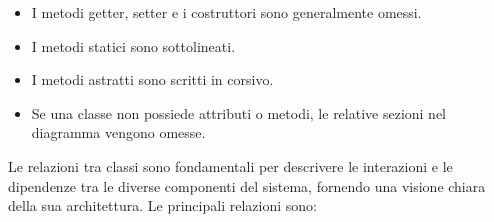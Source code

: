 
\begin{itemize}
    \item I metodi getter, setter e i costruttori sono generalmente omessi.
    \item I metodi statici sono sottolineati.
    \item I metodi astratti sono scritti in corsivo.
    \item Se una classe non possiede attributi o metodi, le relative sezioni nel diagramma vengono omesse.
\end{itemize}


Le relazioni tra classi sono fondamentali per descrivere le interazioni e le dipendenze tra le diverse componenti del sistema, fornendo una visione chiara della sua architettura. Le principali relazioni sono:

